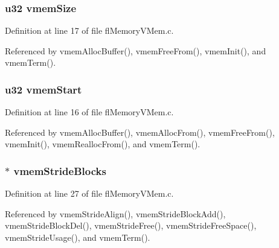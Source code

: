 \subsubsection{\setlength{\rightskip}{0pt plus 5cm}u32 {\bf vmem\-Size}}\label{flMemoryVMem_8h_5bdb4a91bd69dda7958d392b8a318405}




Definition at line 17 of file fl\-Memory\-VMem.c.

Referenced by vmem\-Alloc\-Buffer(), vmem\-Free\-From(), vmem\-Init(), and vmem\-Term().
\subsubsection{\setlength{\rightskip}{0pt plus 5cm}u32 {\bf vmem\-Start}}\label{flMemoryVMem_8h_8ca615adf1b61b83d3787473691f050b}




Definition at line 16 of file fl\-Memory\-VMem.c.

Referenced by vmem\-Alloc\-Buffer(), vmem\-Alloc\-From(), vmem\-Free\-From(), vmem\-Init(), vmem\-Realloc\-From(), and vmem\-Term().
\subsubsection{$\ast$ {\bf vmem\-Stride\-Blocks}}\label{flMemoryVMem_8h_f76725e6d15a4b7ccf09e2a47b8bd21d}




Definition at line 27 of file fl\-Memory\-VMem.c.

Referenced by vmem\-Stride\-Align(), vmem\-Stride\-Block\-Add(), vmem\-Stride\-Block\-Del(), vmem\-Stride\-Free(), vmem\-Stride\-Free\-Space(), vmem\-Stride\-Usage(), and vmem\-Term().